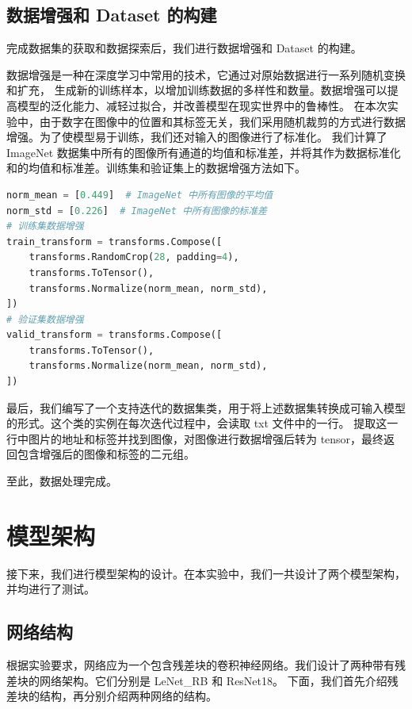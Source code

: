 \documentclass[supercite]{Experimental_Report}
\theoremstyle{definition}
\begin{document}
\subsection{数据增强和 Dataset 的构建}

完成数据集的获取和数据探索后，我们进行数据增强和 Dataset 的构建。

数据增强是一种在深度学习中常用的技术，它通过对原始数据进行一系列随机变换和扩充，
生成新的训练样本，以增加训练数据的多样性和数量。数据增强可以提高模型的泛化能力、减轻过拟合，并改善模型在现实世界中的鲁棒性。
在本次实验中，由于数字在图像中的位置和其标签无关，我们采用随机裁剪的方式进行数据增强。为了使模型易于训练，我们还对输入的图像进行了标准化。
我们计算了 ImageNet 数据集中所有的图像所有通道的均值和标准差，并将其作为数据标准化和的均值和标准差。训练集和验证集上的数据增强方法如下。
\begin{lstlisting}[language=python]
norm_mean = [0.449]  # ImageNet 中所有图像的平均值
norm_std = [0.226]  # ImageNet 中所有图像的标准差
# 训练集数据增强
train_transform = transforms.Compose([
    transforms.RandomCrop(28, padding=4),
    transforms.ToTensor(),
    transforms.Normalize(norm_mean, norm_std),
])
# 验证集数据增强
valid_transform = transforms.Compose([
    transforms.ToTensor(),
    transforms.Normalize(norm_mean, norm_std),
])
\end{lstlisting}

最后，我们编写了一个支持迭代的数据集类，用于将上述数据集转换成可输入模型的形式。这个类的实例在每次迭代过程中，会读取 txt 文件中的一行。
提取这一行中图片的地址和标签并找到图像，对图像进行数据增强后转为 tensor，最终返回包含增强后的图像和标签的二元组。

至此，数据处理完成。

\section{模型架构}
接下来，我们进行模型架构的设计。在本实验中，我们一共设计了两个模型架构，并均进行了测试。
\subsection{网络结构}
根据实验要求，网络应为一个包含残差块的卷积神经网络。我们设计了两种带有残差块的网络架构。它们分别是 LeNet\_RB 和 ResNet18。
下面，我们首先介绍残差块的结构，再分别介绍两种网络的结构。
\end{document}
